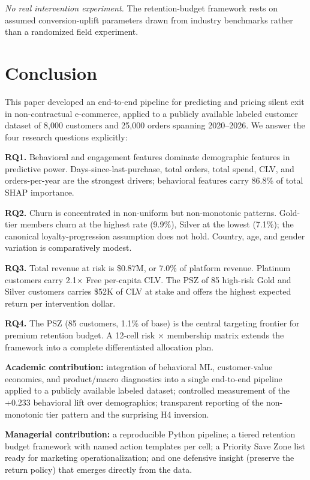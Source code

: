 \documentclass[conference]{IEEEtran}
\begin{document}
\emph{No real intervention experiment.} The retention-budget framework rests on assumed conversion-uplift parameters drawn from industry benchmarks rather than a randomized field experiment.

\section{Conclusion}

This paper developed an end-to-end pipeline for predicting and pricing silent exit in non-contractual e-commerce, applied to a publicly available labeled customer dataset of 8{,}000 customers and 25{,}000 orders spanning 2020--2026. We answer the four research questions explicitly:

\textbf{RQ1.} Behavioral and engagement features dominate demographic features in predictive power. Days-since-last-purchase, total orders, total spend, CLV, and orders-per-year are the strongest drivers; behavioral features carry 86.8\% of total SHAP importance.

\textbf{RQ2.} Churn is concentrated in non-uniform but non-monotonic patterns. Gold-tier members churn at the highest rate (9.9\%), Silver at the lowest (7.1\%); the canonical loyalty-progression assumption does not hold. Country, age, and gender variation is comparatively modest.

\textbf{RQ3.} Total revenue at risk is \$0.87M, or 7.0\% of platform revenue. Platinum customers carry 2.1$\times$ Free per-capita CLV. The PSZ of 85 high-risk Gold and Silver customers carries \$52K of CLV at stake and offers the highest expected return per intervention dollar.

\textbf{RQ4.} The PSZ (85 customers, 1.1\% of base) is the central targeting frontier for premium retention budget. A 12-cell risk $\times$ membership matrix extends the framework into a complete differentiated allocation plan.

\textbf{Academic contribution:} integration of behavioral ML, customer-value economics, and product/macro diagnostics into a single end-to-end pipeline applied to a publicly available labeled dataset; controlled measurement of the +0.233 behavioral lift over demographics; transparent reporting of the non-monotonic tier pattern and the surprising H4 inversion.

\textbf{Managerial contribution:} a reproducible Python pipeline; a tiered retention budget framework with named action templates per cell; a Priority Save Zone list ready for marketing operationalization; and one defensive insight (preserve the return policy) that emerges directly from the data.
\end{document}

